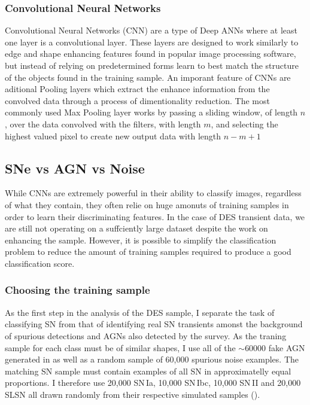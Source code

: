 \subsubsection{Convolutional Neural Networks}
Convolutional Neural Networks (CNN) are a type of Deep ANNs where at least one layer is a convolutional layer. These layers are designed to work similarly to edge and shape enhancing features found in popular image processing software, but instead of relying on predetermined forms learn to best match the structure of the objects found in the training sample. An imporant feature of CNNs are aditional Pooling layers which extract the enhance information from the convolved data through a process of dimentionality reduction. The most commonly used Max Pooling layer works by passing a sliding window, of length $n$, over the data convolved with the filters, with length $m$, and selecting the highest valued pixel to create new output data with length $n-m+1$

\subsection{SNe vs AGN vs Noise}
While CNNs are extremely powerful in their ability to classify images, regardless of what they contain, they often relie on huge amonuts of training samples in order to learn their discriminating features. In the case of DES transient data, we are still not operating on a suffciently large dataset despite the work on enhancing the sample. However, it is possible to simplify the classification problem to reduce the amount of training samples required to produce a good classification score.

\subsubsection{Choosing the training sample} \label{sec:AGNNoiseSNSample}
As the first step in the analysis of the DES sample, I separate the task of classifying SN from that of identifying real SN transients amonst the background of spurious detections and AGNs also detected by the survey. As the traning sample for each class must be of similar shapes, I use all of the $\sim60000$ fake AGN generated in  as well as a random sample of 60,000 spurious noise examples. The matching SN sample must contain examples of all SN in approximatelly equal proportions. I therefore use 20,000 SN\,Ia, 10,000 SN\,Ibc, 10,000 SN\,II and 20,000 SLSN all drawn randomly from their respective simulated samples ().

